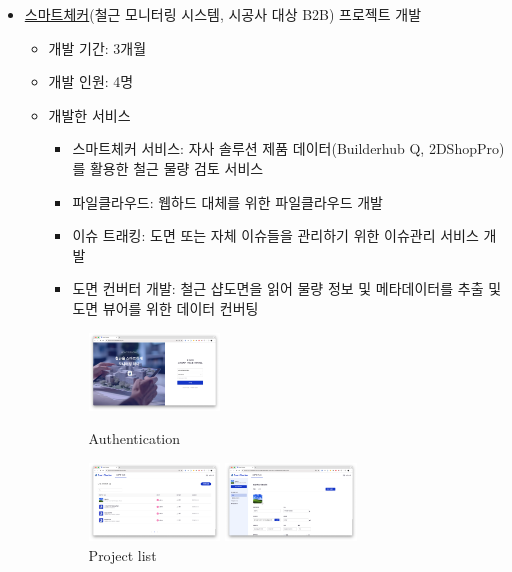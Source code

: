 \begin{itemize}
\begin{itemize}
	\item \href{https://check.builderhub.io/signin}{스마트체커}(철근 모니터링 시스템, 시공사 대상 B2B) 프로젝트 개발
	      \begin{itemize}[label=$\star$]
		      \item 개발 기간: 3개월
		      \item 개발 인원: 4명
		      \item 개발한 서비스
		            \begin{itemize}
			            \item 스마트체커 서비스: 자사 솔루션 제품 데이터(Builderhub Q, 2DShopPro)를 활용한 철근 물량 검토 서비스
			            \item 파일클라우드: 웹하드 대체를 위한 파일클라우드 개발
			            \item 이슈 트래킹: 도면 또는 자체 이슈들을 관리하기 위한 이슈관리 서비스 개발
			            \item 도면 컨버터 개발: 철근 샵도면을 읽어 물량 정보 및 메타데이터를 추출 및 도면 뷰어를 위한 데이터 컨버팅
		            \end{itemize}
		            \begin{figure}[!ht]
			            \begin{fullwidth}
				            \parbox{0.35\textwidth}{
					            \centering
					            \includegraphics[width=0.35\textwidth]{images/smart-checker-auth.png}
					            \caption*{Authentication}
				            }\qquad
				            \parbox{0.35\textwidth}{
					            \centering
					            \includegraphics[width=0.35\textwidth]{images/smart-checker-project-list.png}
					            \caption*{Project list}
				            }\qquad
				            \parbox{0.35\textwidth}{
					            \centering
					            \includegraphics[width=0.35\textwidth]{images/smart-checker-project-info.png}
}
\end{fullwidth}
\end{figure}
\end{itemize}
\end{itemize}
\end{itemize}
